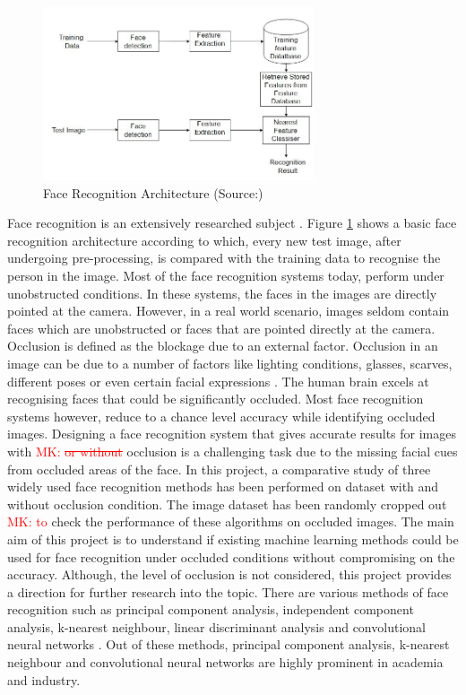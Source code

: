 \documentclass[conference]{IEEEtran}
\newcommand{\MK}[1]{\textcolor{red}{MK: #1}}  %
\begin{document}
\begin{figure}[h!]

 \centering
 \includegraphics[width = 8cm]{Face_Recognition_Architecture.JPG}
 \caption{ Face Recognition Architecture (Source:\cite{makwana_makwana_2016})}
 \label{fig 1: face recognition architecture}
\end{figure}

Face recognition is an extensively researched subject\cite{zhao2003face} \cite{abate20072d}. Figure \ref{fig 1: face recognition architecture} shows a basic face recognition architecture according to which, every new test image, after undergoing pre-processing, is compared with the training data to recognise the person in the image. Most of the face recognition systems today, perform under unobstructed conditions\cite{phillips2005overview}. In these systems, the faces in the images are directly pointed at the camera. However, in a real world scenario, images seldom contain faces which are unobstructed or  faces that are pointed directly at the camera. Occlusion is defined as the blockage due to an external factor. Occlusion in an image can be due to a number of factors like lighting conditions, glasses, scarves, different poses or even certain facial expressions \cite{wright2009robust}. The human brain excels at recognising faces that could be significantly occluded. Most face recognition systems however, reduce to a chance level accuracy while identifying occluded images. Designing a face recognition system that gives accurate results for images with \MK{\sout{or without}} occlusion is a challenging task due to the missing facial cues from occluded areas of the face. In this project, a comparative study of three widely used face recognition methods has been performed on dataset with and without occlusion condition. The image dataset has been randomly cropped out \MK{to} check the performance of these algorithms on occluded images. The main aim of this project is to understand if existing machine learning methods could be used for face recognition under occluded conditions without compromising on the accuracy. Although, the level of occlusion is not considered,  this project provides a direction for further research into the topic. There are various methods of face recognition such as principal component analysis, independent component analysis, k-nearest neighbour, linear discriminant analysis and convolutional neural networks \cite{zhao2003face}. Out of these methods, principal component analysis, k-nearest neighbour and convolutional neural networks are highly prominent in academia and industry.
\end{document}
